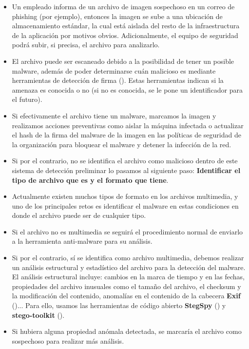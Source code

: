 \begin{itemize}
\item Un empleado informa de un archivo de imagen sospechoso en un correo de phishing (por ejemplo), entonces la imagen se sube a una ubicación de almacenamiento estándar, la cual está aislada del resto de la infraestructura de la aplicación por motivos obvios. Adicionalmente, el equipo de seguridad podrá subir, si precisa, el archivo para analizarlo.
\item El archivo puede ser escaneado debido a la posibilidad de tener un posible malware, además de poder determinarse cuán malicioso es mediante herramientas de detección de firma (\cite{signature-based-detection}). Estas herramientas indican si la amenaza es conocida o no (si no es conocida, se le pone un identificador para el futuro). %
\item Si efectivamente el archivo tiene un malware, marcamos la imagen y realizamos acciones preventivas como aislar la máquina infectada o actualizar el hash de la firma del malware de la imagen en las políticas de seguridad de la organización para bloquear el malware y detener la infección de la red.
\item Si por el contrario, no se identifica el archivo como malicioso dentro de este sistema de detección preliminar lo pasamos al siguiente paso: \textbf{Identificar el tipo de archivo que es y el formato que tiene}.
\item Actualmente existen muchos tipos de formato en los archivos multimedia, y uno de los principales retos es identificar el malware en estas condiciones en donde el archivo puede ser de cualquier tipo.
\item Si el archivo no es multimedia se seguirá el procedimiento normal de enviarlo a la herramienta anti-malware para su análisis.
\item Si por el contrario, sí se identifica como archivo multimedia, debemos realizar un análisis estructural y estadístico del archivo para la detección del malware. El análisis estructural incluye: cambios en la marca de tiempo y en las fechas, propiedades del archivo inusuales como el tamaño del archivo, el checksum y la modificación del contenido, anomalías en el contenido de la cabecera \textbf{Exif} (\cite{exif-header})... Para ello, usamos las herramientas de código abierto \textbf{StegSpy} (\cite{stegspy}) y \textbf{stego-toolkit} (\cite{stego-toolkit}). %
\item Si hubiera alguna propiedad anómala detectada, se marcaría el archivo como sospechoso para realizar más análisis.

\end{itemize}
